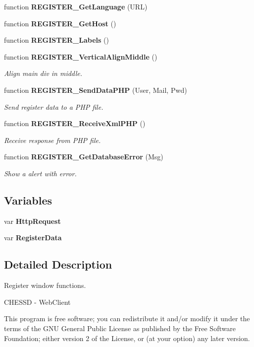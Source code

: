 \begin{CompactItemize}
function {\bf REGISTER\_\-GetLanguage} (URL)
\item 
function {\bf REGISTER\_\-GetHost} ()
\item 
function {\bf REGISTER\_\-Labels} ()
\item 
function {\bf REGISTER\_\-VerticalAlignMiddle} ()
\begin{CompactList}\small\item\em Align main div in middle. \item\end{CompactList}\item 
function {\bf REGISTER\_\-SendDataPHP} (User, Mail, Pwd)
\begin{CompactList}\small\item\em Send register data to a PHP file. \item\end{CompactList}\item 
function {\bf REGISTER\_\-ReceiveXmlPHP} ()
\begin{CompactList}\small\item\em Receive response from PHP file. \item\end{CompactList}\item 
function {\bf REGISTER\_\-GetDatabaseError} (Msg)
\begin{CompactList}\small\item\em Show a alert with error. \item\end{CompactList}\end{CompactItemize}
\subsection*{Variables}
\begin{CompactItemize}
\item 
var {\bf HttpRequest}
\item 
var {\bf RegisterData}
\end{CompactItemize}


\subsection{Detailed Description}
Register window functions. 

CHESSD - WebClient

This program is free software; you can redistribute it and/or modify it under the terms of the GNU General Public License as published by the Free Software Foundation; either version 2 of the License, or (at your option) any later version.

